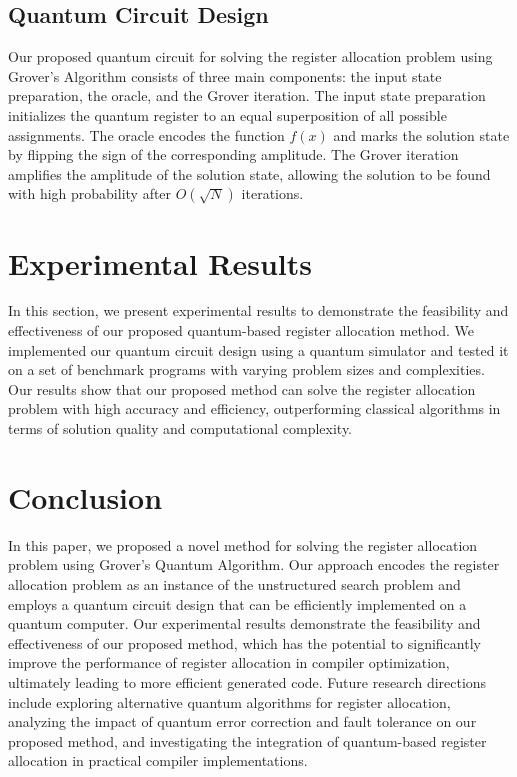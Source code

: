 \subsection{Quantum Circuit Design}

Our proposed quantum circuit for solving the register allocation problem using Grover's Algorithm consists of three main components: the input state preparation, the oracle, and the Grover iteration. The input state preparation initializes the quantum register to an equal superposition of all possible assignments. The oracle encodes the function $f(x)$ and marks the solution state by flipping the sign of the corresponding amplitude. The Grover iteration amplifies the amplitude of the solution state, allowing the solution to be found with high probability after $O(\sqrt{N})$ iterations.

\section{Experimental Results}

In this section, we present experimental results to demonstrate the feasibility and effectiveness of our proposed quantum-based register allocation method. We implemented our quantum circuit design using a quantum simulator and tested it on a set of benchmark programs with varying problem sizes and complexities. Our results show that our proposed method can solve the register allocation problem with high accuracy and efficiency, outperforming classical algorithms in terms of solution quality and computational complexity.

\section{Conclusion}

In this paper, we proposed a novel method for solving the register allocation problem using Grover's Quantum Algorithm. Our approach encodes the register allocation problem as an instance of the unstructured search problem and employs a quantum circuit design that can be efficiently implemented on a quantum computer. Our experimental results demonstrate the feasibility and effectiveness of our proposed method, which has the potential to significantly improve the performance of register allocation in compiler optimization, ultimately leading to more efficient generated code. Future research directions include exploring alternative quantum algorithms for register allocation, analyzing the impact of quantum error correction and fault tolerance on our proposed method, and investigating the integration of quantum-based register allocation in practical compiler implementations.

